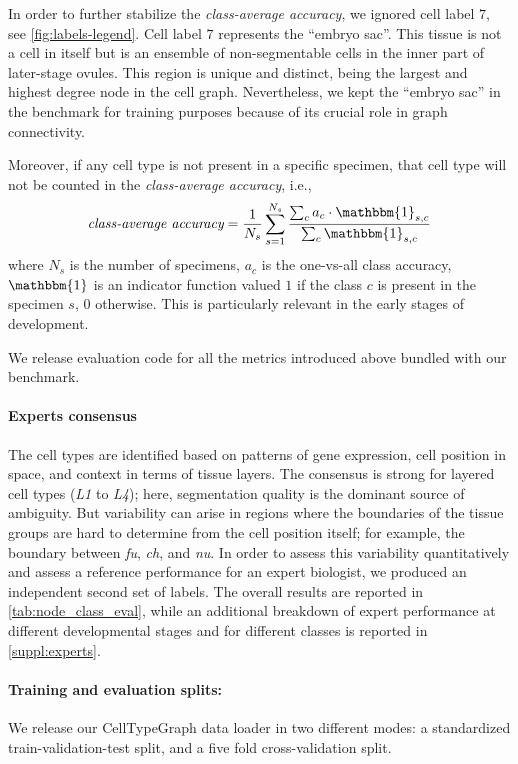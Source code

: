 \documentclass[10pt,twocolumn,letterpaper]{article}
\begin{document}
In order to further stabilize the \textit{class-average accuracy}, we ignored cell label $7$, see \cref{fig:labels-legend}.
Cell label $7$ represents the ``embryo sac''. This tissue is not a cell in itself but is an ensemble of non-segmentable cells in the inner part of later-stage ovules. This region is unique and distinct, being the largest and highest degree node in the cell graph. Nevertheless, we kept the ``embryo sac'' in the benchmark for training purposes because of its crucial role in graph connectivity.

Moreover, if any cell type is not present in a specific specimen, that cell type will not be counted in the \textit{class-average accuracy}, i.e.,
\begin{equation*}
    \textit{class-average accuracy} = \frac{1}{N_s}\sum_{s=1}^{N_s} \frac{\sum_c a_c \cdot \mathbbm{1}_{s, c}}{\sum_c \mathbbm{1}_{s, c}}
\end{equation*}
where $N_s$ is the number of specimens, $a_c$ is the one-vs-all class accuracy, $\mathbbm{1}$ is an indicator function valued $1$ if the class $c$ is present in the specimen $s$, 0 otherwise. This is particularly relevant in the early stages of development.

We release evaluation code for all the metrics introduced above bundled with our benchmark.

\paragraph{Experts consensus}
The cell types are identified based on patterns of gene expression, cell position in space, and context in terms of tissue layers. The consensus is strong for layered cell types (\textit{L1} to \textit{L4}); here, segmentation quality is the dominant source of ambiguity. But variability can arise in regions where the boundaries of the tissue groups are hard to determine from the cell position itself; for example, the boundary between \textit{fu}, \textit{ch}, and \textit{nu}.
In order to assess this variability quantitatively and assess a reference performance for an expert biologist, we produced an independent second set of labels.
The overall results are reported in \cref{tab:node_class_eval}, while an additional breakdown of expert performance at different developmental stages and for different classes is reported in \cref{suppl:experts}.

\paragraph{Training and evaluation splits:} We release our CellTypeGraph data loader in two different modes: a standardized train-validation-test split, and a five fold cross-validation split.
\end{document}
